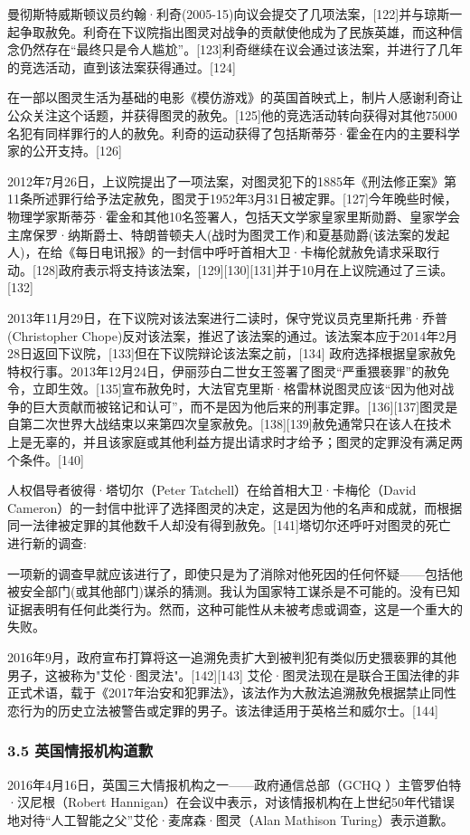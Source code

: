 曼彻斯特威斯顿议员约翰·利奇(2005-15)向议会提交了几项法案，[122]并与琼斯一起争取赦免。利奇在下议院指出图灵对战争的贡献使他成为了民族英雄，而这种信念仍然存在“最终只是令人尴尬”。[123]利奇继续在议会通过该法案，并进行了几年的竞选活动，直到该法案获得通过。[124]

在一部以图灵生活为基础的电影《模仿游戏》的英国首映式上，制片人感谢利奇让公众关注这个话题，并获得图灵的赦免。[125]他的竞选活动转向获得对其他75000名犯有同样罪行的人的赦免。利奇的运动获得了包括斯蒂芬·霍金在内的主要科学家的公开支持。[126]

2012年7月26日，上议院提出了一项法案，对图灵犯下的1885年《刑法修正案》第11条所述罪行给予法定赦免，图灵于1952年3月31日被定罪。[127]今年晚些时候，物理学家斯蒂芬·霍金和其他10名签署人，包括天文学家皇家里斯勋爵、皇家学会主席保罗·纳斯爵士、特朗普顿夫人(战时为图灵工作)和夏基勋爵(该法案的发起人)，在给《每日电讯报》的一封信中呼吁首相大卫·卡梅伦就赦免请求采取行动。[128]政府表示将支持该法案，[129][130][131]并于10月在上议院通过了三读。[132]

2013年11月29日，在下议院对该法案进行二读时，保守党议员克里斯托弗·乔普(Christopher Chope)反对该法案，推迟了该法案的通过。该法案本应于2014年2月28日返回下议院，[133]但在下议院辩论该法案之前，[134] 政府选择根据皇家赦免特权行事。2013年12月24日，伊丽莎白二世女王签署了图灵“严重猥亵罪”的赦免令，立即生效。[135]宣布赦免时，大法官克里斯·格雷林说图灵应该“因为他对战争的巨大贡献而被铭记和认可”，而不是因为他后来的刑事定罪。[136][137]图灵是自第二次世界大战结束以来第四次皇家赦免。[138][139]赦免通常只在该人在技术上是无辜的，并且该家庭或其他利益方提出请求时才给予；图灵的定罪没有满足两个条件。[140]

人权倡导者彼得·塔切尔（Peter Tatchell）在给首相大卫·卡梅伦（David Cameron）的一封信中批评了选择图灵的决定，这是因为他的名声和成就，而根据同一法律被定罪的其他数千人却没有得到赦免。[141]塔切尔还呼吁对图灵的死亡进行新的调查:

一项新的调查早就应该进行了，即使只是为了消除对他死因的任何怀疑——包括他被安全部门(或其他部门)谋杀的猜测。我认为国家特工谋杀是不可能的。没有已知证据表明有任何此类行为。然而，这种可能性从未被考虑或调查，这是一个重大的失败。

2016年9月，政府宣布打算将这一追溯免责扩大到被判犯有类似历史猥亵罪的其他男子，这被称为"艾伦·图灵法"。[142][143] 艾伦·图灵法现在是联合王国法律的非正式术语，载于《2017年治安和犯罪法》，该法作为大赦法追溯赦免根据禁止同性恋行为的历史立法被警告或定罪的男子。该法律适用于英格兰和威尔士。[144]
\subsubsection{3.5 英国情报机构道歉}
2016年4月16日，英国三大情报机构之一——政府通信总部（GCHQ ）主管罗伯特·汉尼根（Robert Hannigan）在会议中表示，对该情报机构在上世纪50年代错误地对待“人工智能之父”艾伦·麦席森·图灵（Alan Mathison Turing）表示道歉。

